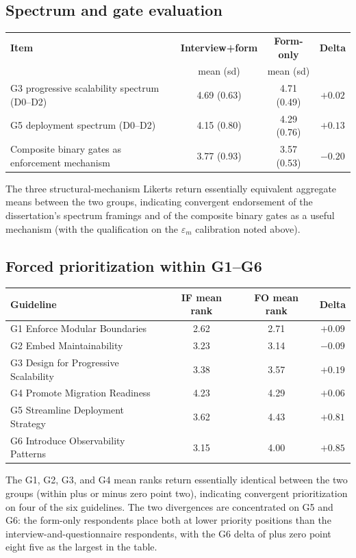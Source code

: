 \subsection*{Spectrum and gate evaluation}

\begin{longtable}{p{6cm} c c c}
\toprule
\textbf{Item} & \textbf{Interview+form} & \textbf{Form-only} & \textbf{Delta} \\
& mean (sd) & mean (sd) & \\
\midrule
\endhead
G3 progressive scalability spectrum (D0--D2) & 4.69 (0.63) & 4.71 (0.49) & $+0.02$ \\
G5 deployment spectrum (D0--D2) & 4.15 (0.80) & 4.29 (0.76) & $+0.13$ \\
Composite binary gates as enforcement mechanism & 3.77 (0.93) & 3.57 (0.53) & $-0.20$ \\
\bottomrule
\end{longtable}

\noindent
The three structural-mechanism Likerts return essentially equivalent aggregate means between the two groups, indicating convergent endorsement of the dissertation's spectrum framings and of the composite binary gates as a useful mechanism (with the qualification on the $\varepsilon_m$ calibration noted above).

\subsection*{Forced prioritization within G1--G6}

\begin{longtable}{p{3cm} c c c}
\toprule
\textbf{Guideline} & \textbf{IF mean rank} & \textbf{FO mean rank} & \textbf{Delta} \\
\midrule
\endhead
G1 Enforce Modular Boundaries & 2.62 & 2.71 & $+0.09$ \\
G2 Embed Maintainability & 3.23 & 3.14 & $-0.09$ \\
G3 Design for Progressive Scalability & 3.38 & 3.57 & $+0.19$ \\
G4 Promote Migration Readiness & 4.23 & 4.29 & $+0.06$ \\
G5 Streamline Deployment Strategy & 3.62 & 4.43 & $+0.81$ \\
G6 Introduce Observability Patterns & 3.15 & 4.00 & $+0.85$ \\
\bottomrule
\end{longtable}

\noindent
The G1, G2, G3, and G4 mean ranks return essentially identical between the two groups (within plus or minus zero point two), indicating convergent prioritization on four of the six guidelines. The two divergences are concentrated on G5 and G6: the form-only respondents place both at lower priority positions than the interview-and-questionnaire respondents, with the G6 delta of plus zero point eight five as the largest in the table.

